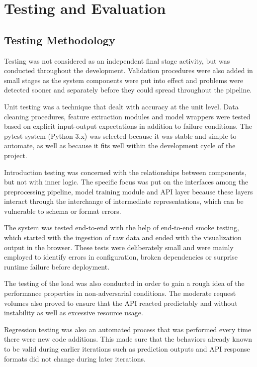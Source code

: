 \section{Testing and Evaluation}

\subsection{Testing Methodology}
Testing was not considered as an independent final stage activity, but was conducted throughout the development. Validation procedures were also added in small stages as the system components were put into effect and problems were detected sooner and separately before they could spread throughout the pipeline.

Unit testing was a technique that dealt with accuracy at the unit level. Data cleaning procedures, feature extraction modules and model wrappers were tested based on explicit input-output expectations in addition to failure conditions. The pytest system (Python 3.x) was selected because it was stable and simple to automate, as well as because it fits well within the development cycle of the project.

Introduction testing was concerned with the relationships between components, but not with inner logic. The specific focus was put on the interfaces among the preprocessing pipeline, model training module and API layer because these layers interact through the interchange of intermediate representations, which can be vulnerable to schema or format errors.

The system was tested end-to-end with the help of end-to-end smoke testing, which started with the ingestion of raw data and ended with the visualization output in the browser. These tests were deliberately small and were mainly employed to identify errors in configuration, broken dependencies or surprise runtime failure before deployment.

The testing of the load was also conducted in order to gain a rough idea of the performance properties in non-adversarial conditions. The moderate request volumes also proved to ensure that the API reacted predictably and without instability as well as excessive resource usage.

Regression testing was also an automated process that was performed every time there were new code additions. This made sure that the behaviors already known to be valid during earlier iterations such as prediction outputs and API response formats did not change during later iterations.

